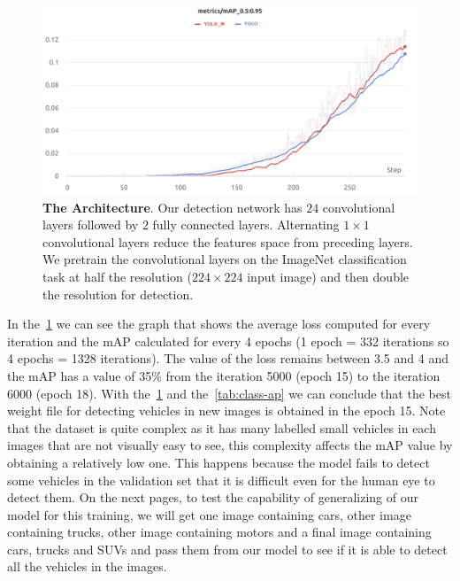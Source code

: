 \begin{figure}[H] %
  \centering
  \includegraphics[width=\textwidth]{figures/paper/mAP.png}
  \caption[The Architecture]{\textbf{The Architecture}. Our detection network has $24$ convolutional layers followed by $2$ fully connected layers. Alternating $1 \times 1$ convolutional layers reduce the features space from preceding layers. We pretrain the convolutional layers on the ImageNet classification task at half the resolution ($224 \times 224$ input image) and then double the resolution for detection.}
  \label{fig:figures/paper/mAP}
\end{figure}

In the~\ref{fig:figures/paper/mAP} we can see the graph that shows the average loss computed for every iteration
and  the  mAP  calculated  for  every  4  epochs  (1  epoch  =  332  iterations  so  4  epochs  =  1328
iterations). The value of the  loss remains between 3.5 and 4  and the mAP has a value of 35\%
from the iteration 5000 (epoch 15) to the iteration 6000 (epoch 18). With the~\ref{fig:figures/paper/mAP}
and the~\ref{tab:class-ap} we can conclude that the best weight file for detecting vehicles in new
images is obtained in the epoch 15. Note that the dataset is quite complex as it has many
labelled small vehicles in each images that are not visually easy to see, this complexity affects
the mAP value by obtaining a relatively low one. This happens because the model fails to detect
some vehicles in the validation set that it is difficult even for the human eye to detect them. On
the next pages, to test the capability of generalizing of our model for this training, we will get
one image containing cars, other image containing trucks, other image containing motors and a
final image containing cars, trucks and SUVs and pass them from our model to see if it is able
to detect all the vehicles in the images.



